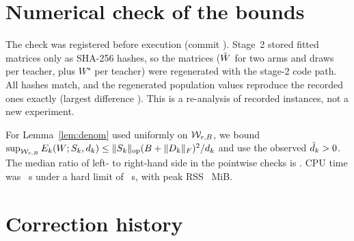 \begin{table}[!ht]
\caption{Stage-1 synthetic fixture: all methods at rank $r=\CfgR$, means over \CfgNTeachers{}
teachers, evaluated on the test sample. $\dagger$: unofficial simplified re-implementation.
$\ddagger$: exceeds the rank budget and is shown for reference only. $\S$: factor averaging
depends on the factorisation gauge and is a diagnostic only. Weight-space baselines were tuned on
the development split, whereas uniform WRRR and minimax have no hyper-parameters.}
\label{tab:stage1}
\centering\small

\end{table}

\section{Numerical check of the bounds}
\label{app:boundcheck}

\begin{table}[!ht]
\caption{Deterministic bounds evaluated on the recorded fits. Entries are medians with
[min, max] over the \CfgNTeachers{} teachers and \CfgNDrawsBound{} calibration draws per teacher. The draws
include the original one, which was seen earlier. The bound is $2\delta+\epsilon_{\mathrm{opt}}$ on
$\WrB$ with the a-posteriori radius $B=\max(\fnorm{\What},\fnorm{W^\star})$.}
\label{tab:boundcheck}
\centering\small
\resizebox{\linewidth}{!}{}
\end{table}

The check was registered before execution (commit \texttt{\SThreeCommit}). Stage~2 stored fitted
matrices only as SHA-256 hashes, so the \SThreeNRefits{} matrices ($\hat{W}$ for two arms and \CfgNDrawsBound{}
draws per teacher, plus $W^\star$ per teacher) were regenerated with the stage-2 code path. All
\SThreeNHashMatch{} hashes match, and the regenerated population values reproduce the recorded ones
exactly (largest difference \SThreeMaxAbsFPopDiffVsRecorded). This is a re-analysis of recorded
instances, not a new experiment.

For Lemma~\ref{lem:denom} used uniformly on $\WrB$, we bound
$\sup_{\mathcal{W}_{r,B}}E_k(W;S_k,d_k)\le\lVert S_k\rVert_{\mathrm{op}}(B+\lVert D_k\rVert_{F})^2/d_k$ and use the observed $\hat{d}_k>0$.
The median ratio of left- to right-hand side in the pointwise checks is
\SThreePointwiseMedianRatio. CPU time was \SThreeCPU~s under a hard limit of \SThreeCPUCap~s,
with peak RSS \SThreeRSS~MiB.

\section{Correction history}
\label{app:corrections}


